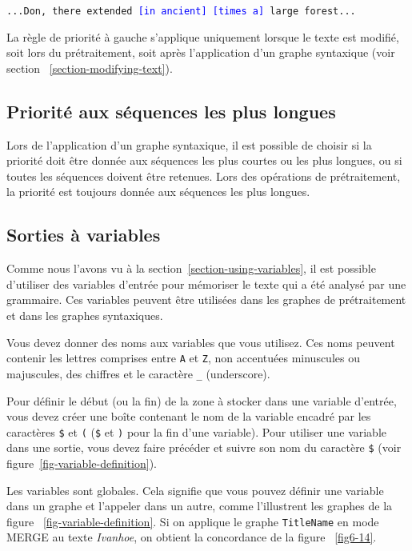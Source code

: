 \begin{center}
\texttt{...Don, there extended \textcolor{blue}{[in ancient] [times a]} large forest...}
\end{center}

\noindent La règle de priorité à gauche s’applique uniquement lorsque le texte est modifié, soit lors
du prétraitement, soit après l’application d’un graphe syntaxique (voir section 
~\ref{section-modifying-text}).

\subsection{Priorité aux séquences les plus longues}
Lors de l’application d’un graphe syntaxique, il est possible de choisir si la priorité doit
être donnée aux séquences les plus courtes ou les plus longues, ou si toutes les séquences
doivent être retenues. Lors des opérations de prétraitement, la priorité est toujours donnée
aux séquences les plus longues.


\subsection{Sorties à variables}
\label{section-variables}
Comme nous l’avons vu à la section~\ref{section-using-variables}, il est possible d’utiliser
des variables d'entrée pour mémoriser le texte qui a été analysé par une grammaire. Ces variables
peuvent être utilisées dans les graphes de prétraitement et dans les graphes syntaxiques.


\bigskip
\noindent Vous devez donner des noms aux variables que vous utilisez. Ces noms peuvent contenir
les lettres comprises entre \verb+A+ et \verb+Z+, non accentuées minuscules ou majuscules, 
des chiffres et le caractère \verb+_+ (underscore).

\bigskip
\noindent Pour définir le début (ou la fin) de la zone à stocker dans une variable d'entrée, vous devez créer
une boîte contenant le nom de la variable encadré par les caractères
\verb-$- et \verb-(- (\verb-$- et \verb-)- pour la fin d’une variable). Pour utiliser une variable
dans une sortie, vous devez faire précéder et suivre son nom du caractère \verb-$- (voir figure~\ref{fig-variable-definition}).

\bigskip
\noindent Les variables sont globales. Cela signifie que vous pouvez définir une variable dans un
graphe et l’appeler dans un autre, comme l’illustrent les graphes de la figure
~\ref{fig-variable-definition}. Si on applique le graphe \verb+TitleName+ en mode MERGE au texte
\textit{Ivanhoe}, on obtient la concordance de la figure ~\ref{fig6-14}.

